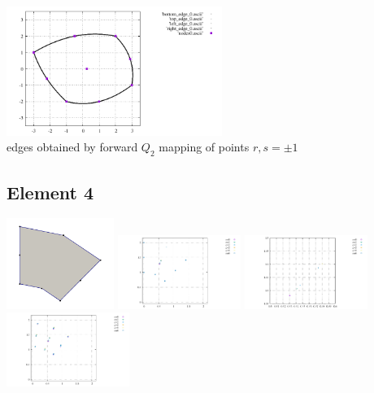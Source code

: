 \begin{center}
\includegraphics[width=7cm]{images/mappings/biquadratic3/elt3/edges}\\
{\captionfont edges obtained by forward $Q_2$ mapping of points $r,s=\pm1$}
\end{center}





\newpage
\subsection*{Element 4}

\begin{center}
\includegraphics[width=3.5cm]{images/mappings/biquadratic3/elt4/element4}
\includegraphics[width=4cm]{images/mappings/biquadratic3/elt4/nodes}
\includegraphics[width=4cm]{images/mappings/biquadratic3/elt4/nodes_zoom}
\includegraphics[width=4cm]{images/mappings/biquadratic3/elt4/quad_points}
\end{center}

